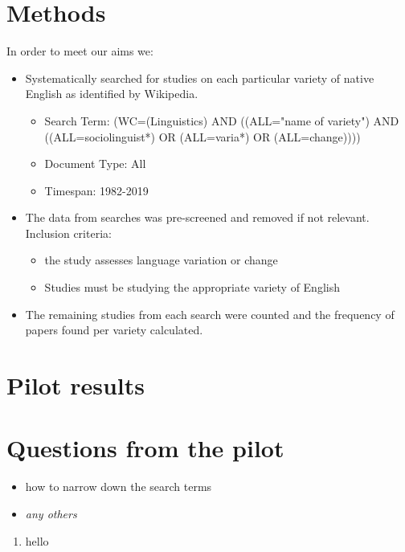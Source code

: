 \documentclass[a0paper,fleqn]{betterposter}
\begin{document}
{
	
\section{Methods}

In order to meet our aims we:
\begin{itemize}
	\item Systematically searched for studies on each particular variety of native English as identified by Wikipedia.
	\begin{itemize}
		\item Search Term: (WC=(Linguistics)  AND  ((ALL="name of variety")  AND  ((ALL=sociolinguist*)  OR  (ALL=varia*)  OR  (ALL=change))))
		\item Document Type: All
		\item Timespan: 1982-2019 
	\end{itemize}
	\item The data from searches was pre-screened and removed if not relevant. Inclusion criteria:
	\begin{itemize}
		\item the study assesses language variation or change
		\item Studies must be studying the appropriate variety of English
	\end{itemize}
	\item The remaining studies from each search were counted and the frequency of papers found per variety calculated.

\end{itemize}



\section{Pilot results}

\section{Questions from the pilot}
\begin{itemize}
	\item how to narrow down the search terms
	\item \textit{any others}
\end{itemize}



}


\begin{enumerate}
	\item hello	
\end{enumerate}
\end{document}
